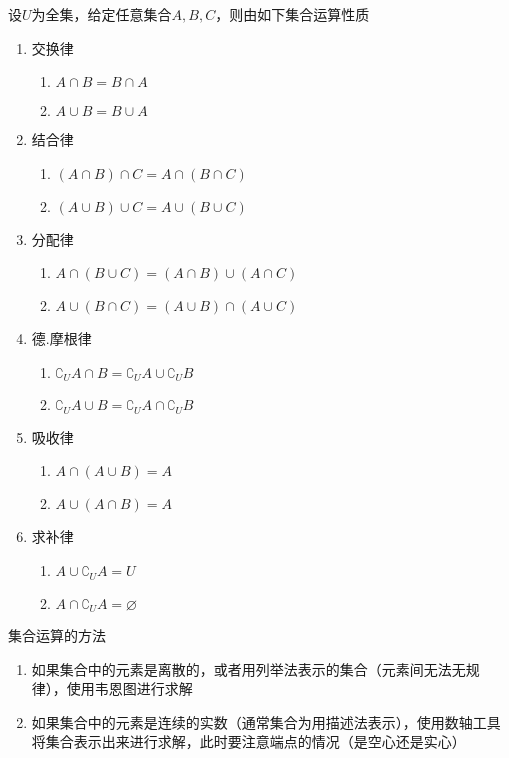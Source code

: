 \begin{property}\label{property:set-operation}
设$U$为全集，给定任意集合$A, B, C$，则由如下集合运算性质
	\begin{enumerate}
		\item 交换律
		\begin{enumerate}
			\item $A \cap B = B \cap A$
			\item $A \cup B = B \cup A$
		\end{enumerate}
		\item 结合律
		\begin{enumerate}
			\item $(A \cap B) \cap C = A \cap (B \cap C)$
			\item $(A \cup B) \cup C = A \cup (B \cup C)$
		\end{enumerate}
		\item 分配律
		\begin{enumerate}
			\item $A \cap (B \cup C) = (A \cap B) \cup (A \cap C)$
			\item $A \cup (B \cap C) = (A \cup B) \cap (A \cup C)$
		\end{enumerate}
		\item 德.摩根律
		\begin{enumerate}
			\item $\complement_{U}{A \cap B} = \complement_{U}{A} \cup \complement_{U}{B}$
			\item $\complement_{U}{A \cup B} = \complement_{U}{A} \cap \complement_{U}{B}$
		\end{enumerate}
		\item 吸收律
		\begin{enumerate}
			\item $A \cap (A \cup B) = A$
			\item $A \cup (A \cap B) = A$
		\end{enumerate}
		\item 求补律
		\begin{enumerate}
			\item $A \cup \complement_{U}{A} = U$
			\item $A \cap \complement_{U}{A} = \varnothing$
		\end{enumerate}
	\end{enumerate}
\end{property}



\begin{note}{集合运算的方法}
	\begin{enumerate}
		\item 如果集合中的元素是离散的，或者用列举法表示的集合（元素间无法无规律），使用韦恩图进行求解
		\item 如果集合中的元素是连续的实数（通常集合为用描述法表示），使用数轴工具将集合表示出来进行求解，此时要注意端点的情况（是空心还是实心）
	\end{enumerate}
\end{note}


